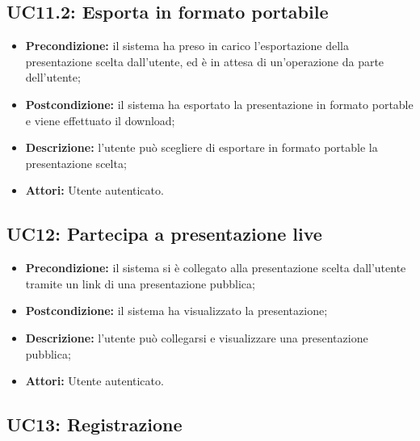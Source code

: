 \subsection{ UC11.2: Esporta in formato portabile}

\begin{itemize}
	\item \textbf{Precondizione:} il sistema ha preso in carico l'esportazione della presentazione scelta dall'utente, ed è in attesa di un'operazione da parte dell'utente;
	\item \textbf{Postcondizione:} il sistema ha esportato la presentazione in formato portable e viene effettuato il download;
	\item \textbf{Descrizione:} l'utente può scegliere di esportare in formato portable la presentazione scelta;
	\item \textbf{Attori:} Utente autenticato.
\end{itemize}
\subsection{ UC12: Partecipa a presentazione live}

\begin{itemize}
	\item \textbf{Precondizione:} il sistema si è collegato alla presentazione scelta dall'utente tramite un link di una presentazione pubblica;
	\item \textbf{Postcondizione:} il sistema ha visualizzato la presentazione;
	\item \textbf{Descrizione:} l'utente può collegarsi e visualizzare una presentazione pubblica;
	\item \textbf{Attori:} Utente autenticato.
\end{itemize}
\subsection{ UC13: Registrazione}

